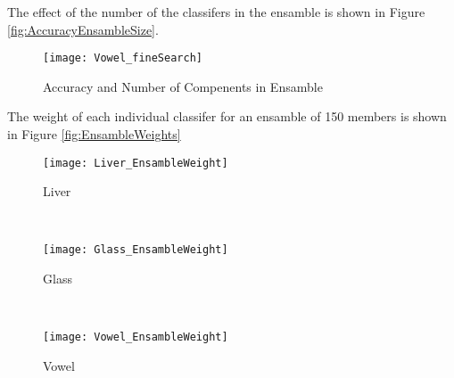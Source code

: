 The effect of the number of the classifers in the ensamble is shown in Figure \ref{fig:AccuracyEnsambleSize}.
\begin{figure}
    \label{fig:AccuarcyEnsambleSize}
    \centering
    \texttt{[image: Vowel\_fineSearch]}
    \caption{Accuracy and Number of Compenents in Ensamble}
\end{figure}
The weight of each individual classifer for an ensamble of 150 members is shown in Figure \ref{fig:EnsambleWeights}
\begin{figure*}[ht!]
	\centering
	\begin{subfigure}[b]{0.3\textwidth}
		\centering
		\texttt{[image: Liver\_EnsambleWeight]}
        \caption{Liver}
	\end{subfigure}%
	~
	\begin{subfigure}[b]{0.3\textwidth}
		\centering
		\texttt{[image: Glass\_EnsambleWeight]}
        \caption{Glass}
	\end{subfigure}	
    ~
	\begin{subfigure}[b]{0.3\textwidth}
		\centering
		\texttt{[image: Vowel\_EnsambleWeight]}
        \caption{Vowel}
	\end{subfigure}%
	\caption{Distribution of Ensamble Weights}
	\label{fig:EnsambleWeights}
\end{figure*}
